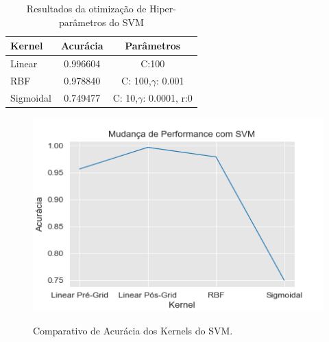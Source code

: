 \begin{table}[h!]
  \begin{center}
    \caption{Resultados da otimização de Hiper-parâmetros do SVM}
    \label{r.t3}
    \begin{tabular}{l|c|c} %
      \textbf{Kernel} & \textbf{Acurácia} & \textbf{Parâmetros}\\
      \hline
      Linear & 0.996604 & C:100\\
      RBF & 0.978840 & C: 100,$\gamma$: 0.001\\
      Sigmoidal & 0.749477 & C: 10,$\gamma$: 0.0001, r:0\\
    \end{tabular}
  \end{center}
\end{table}

\begin{figure}[h]
\caption{Comparativo de Acurácia dos Kernels do SVM.}
\centering
\includegraphics[scale=0.7]{figs/Hiperparametros.png}
\label{r.grafgrid}
\end{figure}